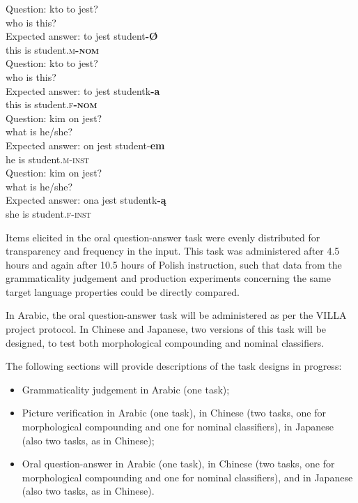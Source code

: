 \documentclass[output=paper,colorlinks,citecolor=brown,modfonts,nonflat]{../langscibook}
\begin{document}
\ea%
    \label{ex:watorek:4}
    \ea%
    \label{ex:watorek:4a}
    \gll    Question: kto to jest?\\
            {} who is this?\\
    \ex%
    \label{ex:watorek:4b}
    \gll    Expected answer: to jest student\textbf{-Ø}\\
            {} {} this is student\textsc{.m\textbf{-nom}}\\
    \ex%
    \label{ex:watorek:4c}
    \gll    Question: kto to jest?\\
            {} who is this?\\
    \ex%
    \label{ex:watorek:4d}
    \gll    Expected answer: to jest studentk\textbf{{-a}}\\
            {} {} this is student\textsc{.f\textbf{-nom}}\\
    \ex%
    \label{ex:watorek:4e}
    \gll    Question: kim on jest?\\
            {} what is he/she?\\
    \ex%
    \label{ex:watorek:4f}
    \gll    Expected answer: on jest student-\textbf{{em}}\\
            {} {} he is student\textsc{.m-inst}\\
    \ex%
    \label{ex:watorek:4g}
    \gll    Question: kim on jest?\\
            {} what is he/she?\\
    \ex%
    \label{ex:watorek:4h}
    \gll    Expected answer: ona jest studentk\textbf{{-ą}}\\
            {} {} she is student\textsc{.f-inst}\\
    \z
\z

Items elicited in the oral question-answer task were evenly distributed for transparency and frequency in the input. This task was administered after 4.5 hours and again after 10.5 hours of Polish instruction, such that data from the grammaticality judgement and production experiments concerning the same target language properties could be directly compared. 

In Arabic, the oral question-answer task will be administered as per the VILLA project protocol. In Chinese and Japanese, two versions of this task will be designed, to test both morphological compounding and nominal classifiers.

The following sections will provide descriptions of the task designs in progress:

\begin{itemize}
    \item Grammaticality judgement in Arabic (one task);
    \item Picture verification in Arabic (one task), in Chinese (two tasks, one for morphological compounding and one for nominal classifiers), in Japanese (also two tasks, as in Chinese);
    \item Oral question-answer in Arabic (one task), in Chinese (two tasks, one for morphological compounding and one for nominal classifiers), and in Japanese (also two tasks, as in Chinese).
\end{itemize}
\end{document}
